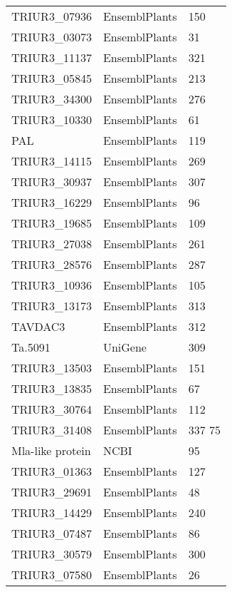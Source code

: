 \footnotesize{
\begin{longtable}{|p{5cm}|p{5cm}|p{5cm}|}
\hline
\centering{\bf{Gène}} &\centering{\bf{Référence}} &\centering{\bf{Contigs}} \\ 
\endhead\hline
TRIUR3\_07936 & EnsemblPlants  & 150 \\
\hline
TRIUR3\_03073 & EnsemblPlants  & 31 \\
\hline
TRIUR3\_11137 & EnsemblPlants  & 321 \\
\hline
TRIUR3\_05845 & EnsemblPlants  & 213 \\
\hline
TRIUR3\_34300 & EnsemblPlants  & 276 \\
\hline
TRIUR3\_10330 & EnsemblPlants  & 61 \\
\hline
PAL & EnsemblPlants & 119 \\
\hline
TRIUR3\_14115 & EnsemblPlants  & 269 \\
\hline
TRIUR3\_30937 & EnsemblPlants  & 307 \\
\hline
TRIUR3\_16229 & EnsemblPlants  & 96 \\
\hline
TRIUR3\_19685 & EnsemblPlants  & 109 \\
\hline
TRIUR3\_27038 & EnsemblPlants  & 261 \\
\hline
TRIUR3\_28576 & EnsemblPlants  & 287 \\
\hline
TRIUR3\_10936 & EnsemblPlants  & 105 \\
\hline
TRIUR3\_13173 & EnsemblPlants  & 313 \\
\hline
TAVDAC3 & EnsemblPlants & 312 \\
\hline
Ta.5091 & UniGene & 309 \\
\hline
TRIUR3\_13503 & EnsemblPlants  & 151 \\
\hline
TRIUR3\_13835 & EnsemblPlants  & 67 \\
\hline
TRIUR3\_30764 & EnsemblPlants  & 112 \\
\hline
TRIUR3\_31408 & EnsemblPlants  & 337 75 \\
\hline
Mla-like protein & NCBI & 95 \\
\hline
TRIUR3\_01363 & EnsemblPlants  & 127 \\
\hline
TRIUR3\_29691 & EnsemblPlants  & 48 \\
\hline
TRIUR3\_14429 & EnsemblPlants  & 240 \\
\hline
TRIUR3\_07487 & EnsemblPlants  & 86 \\
\hline
TRIUR3\_30579 & EnsemblPlants  & 300 \\
\hline
TRIUR3\_07580 & EnsemblPlants  & 26 \\

\end{longtable}}
